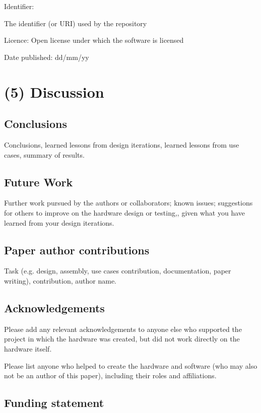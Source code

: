 \documentclass[a4paper]{article}
\begin{document}
Identifier: {The identifier (or URI) used by the repository

Licence: Open license under which the software is licensed

Date published: dd/mm/yy


\section{(5) Discussion}\label{h.90jl7wm65t65}

\subsection{Conclusions}\label{h.h3fr33ylzsnh}

Conclusions, learned lessons from design iterations, learned lessons
from use cases, summary of results.


\subsection{Future Work}\label{h.neocsr410zj}

Further work pursued by the authors or collaborators; known issues;
suggestions for others to improve on the hardware design or testing,,
given what you have learned from your design iterations.


\subsection{Paper author contributions}\label{h.fy8hbipy6kwe}

Task (e.g. design, assembly, use cases contribution, documentation,
paper writing), contribution, author name.


\subsection{Acknowledgements}\label{h.gu3yyarx72d6}

Please add any relevant acknowledgements to anyone else who supported
the project in which the hardware was created, but did not work directly
on the hardware itself.

Please list anyone who helped to create the hardware and software (who
may also not be an author of this paper), including their roles and
affiliations.


\subsection{Funding statement}\label{h.4u1a7tugh2om}

}
\end{document}
